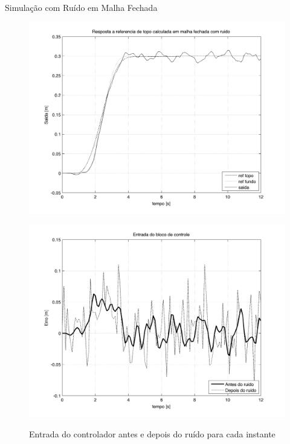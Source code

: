 \documentclass[10pt]{beamer}
\begin{document}
\begin{frame}[fragile]{Simulação com Ruído em Malha Fechada}
\begin{figure}[!htb]
    \centering
    \begin{minipage}{.45\textwidth}
        \centering
        
        \includegraphics[width=1\linewidth]{figures/resultados/simulacao/respostaMalhaAbertaRefTopoRuido}
        \label{respostaMalhaAbertaRefTopoRuido}
        \caption{Resposta do Sistema em Malha Fechada para Excursão de 30cm, entrada suave, com ruído}
    \end{minipage}%
    \hspace{0.1cm}
    \begin{minipage}{0.45\textwidth}
        \centering
               \includegraphics[width=1\linewidth]{figures/resultados/simulacao/entradaControladorYERR}
        \label{entradaControladorYERR}
        \caption{Entrada do controlador antes e depois do ruído para cada instante}

    \end{minipage}
\end{figure}	
\end{frame}
\end{document}
